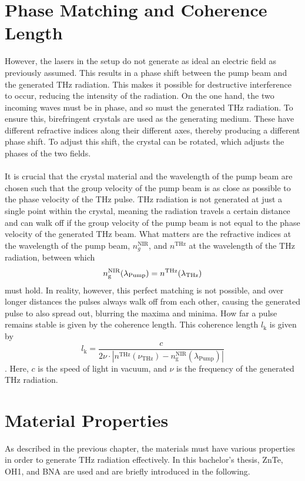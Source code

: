 \section{Phase Matching and Coherence Length}
\label{sec:PA}
However, the lasers in the setup do not generate as ideal an electric field as previously
assumed.
This results in a phase shift between the pump beam and the generated THz radiation.
This makes it possible for destructive interference to occur, reducing the intensity of the
radiation.
On the one hand, the two incoming waves must be in phase, and so must the generated THz
radiation.
To ensure this, birefringent crystals are used as the generating medium.
These have different refractive indices along their different axes, thereby producing a
different phase shift.
To adjust this shift, the crystal can be rotated, which adjusts the
phases of the two fields. \\ \\
It is crucial that the crystal material and the wavelength of
the pump beam are chosen such that the group velocity of the pump beam is as close as possible to
the phase velocity of the THz pulse.
THz radiation is not generated at just a single point within the crystal, meaning the
radiation travels a certain distance and can walk off if the group velocity of the pump beam
is not equal to the phase velocity of the generated THz beam.
What matters are the refractive indices at the wavelength of the pump beam, $n_g^\text{NIR}$,
and $n^\text{THz}$ at the wavelength of the THz radiation, between which
\begin{equation}
    \label{eqn:brech}
    n_\text g^\text{NIR}(\lambda_\text{Pump})= n^\text{THz}(\lambda_\text{THz})
\end{equation}
must hold. In reality, however, this perfect matching is not possible, and over longer
distances the pulses always walk off from each other, causing the generated pulse to also
spread out, blurring the maxima and minima.
How far a pulse remains stable is given by the coherence length.
This coherence length $l_\text{k}$ is given by
\begin{equation}
    \label{eqn:koh}
     l_\text{k}= \frac{c}{2\nu\cdot |n^\text{THz}(\nu_\text{THz})-n^\text{NIR}_\text{g}(\lambda_\text{Pump})| }
\end{equation}
\cite{brunner2014thz}.
Here, $c$ is the speed of light in vacuum, and $\nu$ is the frequency of the generated THz
radiation.


\section{Material Properties}
\label{sec:ME}
As described in the previous chapter, the materials must have various properties in order to
generate THz radiation effectively.
In this bachelor's thesis, ZnTe, OH1, and BNA are used and are briefly introduced in the
following.

